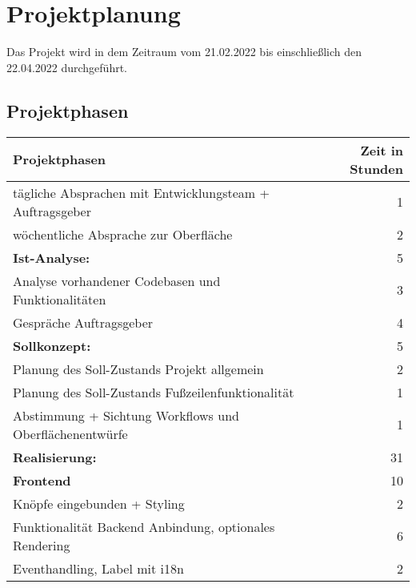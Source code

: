 \newpage
\section{Projektplanung}
\label{projektplanung}
Das Projekt wird in dem Zeitraum vom 21.02.2022  bis einschließlich den 22.04.2022 durchgeführt.

\subsection{Projektphasen}
\label{projektphasen}

{
\begin{tabular}{|l|r|}
	\hline
	\textbf{Projektphasen }                                  & \textbf{Zeit in Stunden} \\ \hline
	tägliche Absprachen mit Entwicklungsteam + Auftragsgeber &                        1 \\
	wöchentliche Absprache zur Oberfläche                    &                        2 \\
	\textbf{Ist-Analyse: }                                   &                        5 \\
	Analyse vorhandener Codebasen und Funktionalitäten       &                        3 \\
	Gespräche Auftragsgeber                                  &                        4 \\
	\textbf{Sollkonzept:  }                                  &                        5 \\
	Planung des Soll-Zustands Projekt allgemein              &                        2 \\
	Planung des Soll-Zustands Fußzeilenfunktionalität        &                        1 \\
	Abstimmung + Sichtung Workflows und Oberflächenentwürfe  &                        1 \\
	\textbf{Realisierung: }                                  &                       31 \\
	\textbf{Frontend  }                                      &                       10 \\
	Knöpfe eingebunden + Styling                             &                        2 \\
	Funktionalität Backend Anbindung, optionales Rendering   &                        6 \\
	Eventhandling, Label mit i18n                            &                        2 \\

\end{tabular}}
